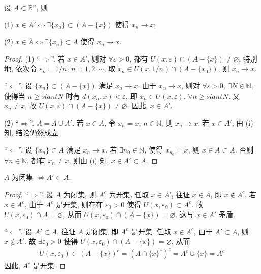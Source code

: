 \documentclass[../../main.tex]{subfiles}
\begin{document}
\begin{proposition}\label{proposition:一个点在导集或闭包中的充要条件}
设 $A \subset \mathbb{R}^n$, 则

(1) $x \in A' \Leftrightarrow \exists \{x_n\} \subset (A - \{x\})$ 使得 $x_n \to x$;

(2) $x \in \overline{A} \Leftrightarrow \exists \{x_n\} \subset A$ 使得 $x_n \to x$.
\end{proposition}
\begin{proof}
(1) “$\Rightarrow$”. 若 $x \in A'$, 则对 $\forall \varepsilon > 0$, 都有 $U(x, \varepsilon) \cap (A - \{x\}) \neq \varnothing$. 特别地, 依次令 $\varepsilon_n = 1/n$, $n = 1, 2, \cdots$, 取 $x_n \in U(x, 1/n) \cap (A - \{x_0\})$, 则 $x_n \to x$.

“$\Leftarrow$”. 设 $\{x_n\} \subset (A - \{x\})$ 满足 $x_n \to x$. 由于 $x_n \to x$, 则对 $\forall \varepsilon > 0$, $\exists N \in \mathbb{N}$, 使得当 $n \geqslant slant N$ 时有 $d(x_n, x) < \varepsilon$, 即 $x_n \in U(x, \varepsilon)$. $\forall n \geqslant slant N$. 又 $x_n \neq x$, 故 $U(x, \varepsilon) \cap (A - \{x\}) \neq \varnothing$. 因此, $x \in A'$. 

(2) “$\Rightarrow$”. $\overline{A} = A \cup A'$. 若 $x \in A$, 令 $x_n = x$, $n \in \mathbb{N}$, 则 $x_n \to x$. 若 $x \in A'$, 由 (i) 知, 结论仍然成立.

“$\Leftarrow$”. 设 $\{x_n\} \subset A$ 满足 $x_n \to x$. 若 $\exists n_0 \in \mathbb{N}$, 使得 $x_{n_0} = x$, 则 $x \in A \subset \overline{A}$. 否则 $\forall n \in \mathbb{N}$, 都有 $x_n \neq x$, 则由 (i) 知, $x \in A' \subset \overline{A}$.
\end{proof}

\begin{theorem}
$A$ 为闭集 $\Leftrightarrow A' \subset A$.
\end{theorem}
\begin{proof}
“$\Rightarrow$”. 设 $A$ 为闭集, 则 $A^c$ 为开集. 任取 $x \in A'$, 往证 $x \in A$, 即 $x \notin A^c$. 若 $x \in A^c$, 由于 $A^c$ 是开集, 则存在 $\varepsilon_0 > 0$ 使得 $U(x, \varepsilon_0) \subset A^c$. 故 $U(x, \varepsilon_0) \cap A = \varnothing$, 从而 $U(x, \varepsilon_0) \cap (A - \{x\}) = \varnothing$. 这与 $x \in A'$ 矛盾.

“$\Leftarrow$”. 设 $A' \subset A$, 往证 $A$ 是闭集, 即 $A^c$ 是开集. 任取 $x \in A^c$, 由于 $A' \subset A$, 则 $x \notin A'$. 故 $\exists \varepsilon_0 > 0$ 使得 $U(x, \varepsilon_0) \cap (A - \{x\}) = \varnothing$, 从而
\begin{align*}
U(x, \varepsilon_0) \subset (A - \{x\})^c = (A \cap \{x\}^c)^c = A^c \cup \{x\} = A^c
\end{align*}
因此, $A^c$ 是开集.
\end{proof}
\end{document}
